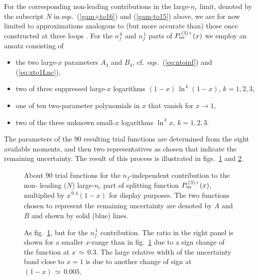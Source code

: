 \documentclass[12pt]{article}
\def\nc{{n_c}}
\def\nf{{n^{}_{\! f}}}
\def\nfz{{n^{\,0}_{\! f}}}
\def\nfo{{n^{\,1}_{\! f}}}
\def\xm1{{(1 \! - \! x)}}
\begin{document}
\bigskip

For the corresponding non-leading contributions in the large-$\nc$ limit, 
denoted by the subscript $N$ in eqs.~(\ref{gam+to16}) and (\ref{gam-to15}) 
above, we are for now limited to approximations analogous to (but more accurate
than) those once constructed at three loops
\cite{vanNeerven:1999ca,vanNeerven:2000uj,vanNeerven:2000wp}.
For the $\nfz$ and $\nfo$ parts of $P_{\rm ns}^{\,(3)+}(x)$ we employ an 
ansatz consisting of 
%
\begin{itemize}
\item the two large-$x$ parameters $A_4$ and $B_4$, 
      cf.~eqs.~(\ref{eq:ntoinf}) and (\ref{eq:xto1Lnc}),
\item two of three suppressed large-$x$ logarithms 
      $\xm1\, \ln^{\,k\!}\xm1$, $k = 1,2,3$, 
\item one of ten two-parameter polynomials in $x$ that vanish for 
      $x \to 1$, 
\item two of the three unknown small-$x$ logarithms $\ln^{\,k\!}x$, 
      $k = 1,2,3$. 
\end{itemize}
% 
The parameters of the 90 resulting trial functions are determined from the
eight available moments, and then two representatives as chosen that indicate
the remaining uncertainty. 
The result of this process is illustrated in figs.~\ref{fig:P3Nnc0a} and 
\ref{fig:P3Nnc1a}.

\begin{figure}[p]
\vspace{-4mm}
\centerline{}
\vspace{-2mm}
\caption{ \label{fig:P3Nnc0a} \small
 About 90 trial functions for the $\nf$-independent contribution to the non-%
 leading ($N$) large-$\nc$ part of splitting function $P_{\rm ns}^{\,(3)+}(x)$,
 multiplied by $x^{\,0.4}\xm1_{}$ for display purposes.
 The two functions chosen to represent the remaining uncertainty are denoted
 by $A$ and $B$ and shown by solid (blue) lines.
 }
\vspace{1mm}
\end{figure}
%
\begin{figure}[p]
\vspace{-2mm}
\centerline{}
\vspace{-2mm}
\caption{ \label{fig:P3Nnc1a} \small
 As fig.~\ref{fig:P3Nnc0a}, but for the $\nfo$ contribution.  The ratio in the 
 right panel is shown for a smaller $x$-range than in fig.~\ref{fig:P3Nnc0a} 
 due to a sign change of the function at $x \,\simeq\, 0.3$. 
 The large relative width of the uncertainty band close to $x=1$ is due to 
 another change of sign at $\xm1 \,\simeq\, 0.005$.
 }
\vspace{-1mm}
\end{figure}
\end{document}
